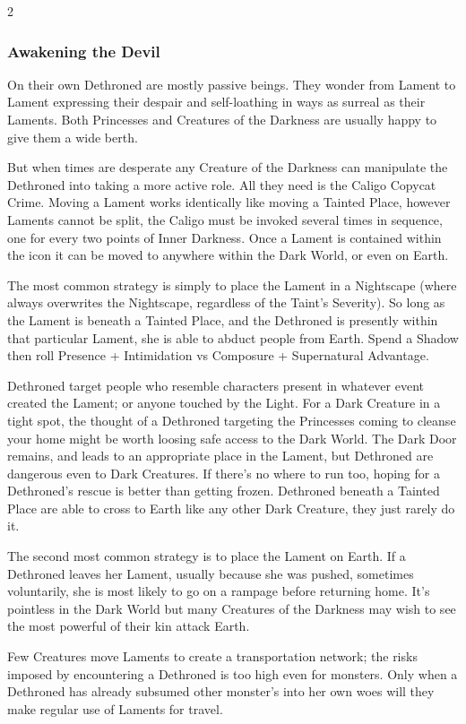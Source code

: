 \begin{multicols}{2}
\subsubsection*{Awakening the Devil}

On their own Dethroned are mostly passive beings. They wonder from Lament to Lament expressing their despair and self-loathing in ways as surreal as their Laments. Both Princesses and Creatures of the Darkness are usually happy to give them a wide berth.

But when times are desperate any Creature of the Darkness can manipulate the Dethroned into taking a more active role. All they need is the Caligo Copycat Crime. Moving a Lament works identically like moving a Tainted Place, however Laments cannot be split, the Caligo must be invoked several times in sequence, one for every two points of Inner Darkness. Once a Lament is contained within the icon it can be moved to anywhere within the Dark World, or even on Earth.

The most common strategy is simply to place the Lament in a Nightscape (where always overwrites the Nightscape, regardless of the Taint's Severity). So long as the Lament is beneath a Tainted Place, and the Dethroned is presently within that particular Lament, she is able to abduct people from Earth. Spend a Shadow then roll Presence + Intimidation vs Composure + Supernatural Advantage.

Dethroned target people who resemble characters present in whatever event created the Lament; or anyone touched by the Light. For a Dark Creature in a tight spot, the thought of a Dethroned targeting the Princesses coming to cleanse your home might be worth loosing safe access to the Dark World. The Dark Door remains, and leads to an appropriate place in the Lament, but Dethroned are dangerous even to Dark Creatures. If there's no where to run too, hoping for a Dethroned's rescue is better than getting frozen. Dethroned beneath a Tainted Place are able to cross to Earth like any other Dark Creature, they just rarely do it. 

The second most common strategy is to place the Lament on Earth. If a Dethroned leaves her Lament, usually because she was pushed, sometimes voluntarily, she is most likely to go on a rampage before returning home. It's pointless in the Dark World but many Creatures of the Darkness may wish to see the most powerful of their kin attack Earth.

Few Creatures move Laments to create a transportation network; the risks imposed by encountering a Dethroned is too high even for monsters. Only when a Dethroned has already subsumed other monster's into her own woes will they make regular use of Laments for travel.


\end{multicols}

